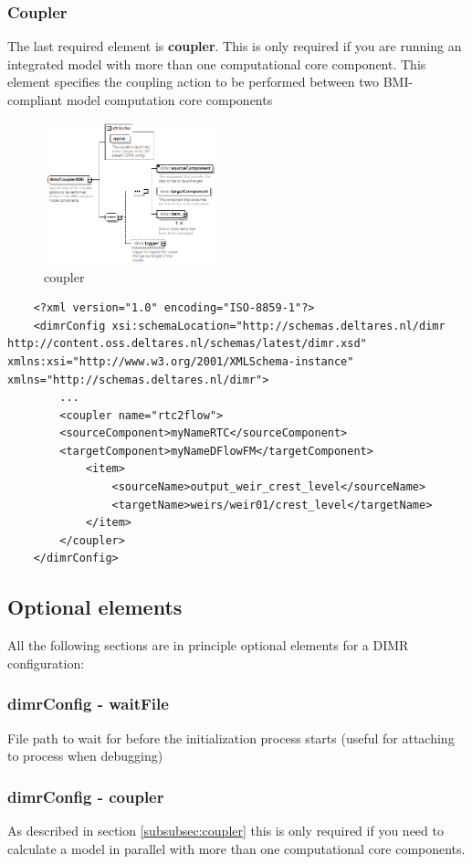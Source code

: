 \documentclass[signature]{deltares_manual}
\newcommand{\dimr}{\textrm{DIMR}\xspace}
\begin{document}
\subsubsection{Coupler}
\label{subsubsec:coupler}
The last required element is \textbf{coupler}. This is only required if you are running an integrated model with more than one computational core component. This element specifies the coupling action to be performed between two BMI-compliant model computation core components
\begin{figure}[H]
	\centering
	\includegraphics[width=0.45\textwidth] {pictures/dimr_diagrams/dimr_p17.png}
	\caption{coupler} 
	\label{fig:dimrCoupler}
\end{figure}
\begin{lstlisting}
	<?xml version="1.0" encoding="ISO-8859-1"?>
	<dimrConfig xsi:schemaLocation="http://schemas.deltares.nl/dimr http://content.oss.deltares.nl/schemas/latest/dimr.xsd" xmlns:xsi="http://www.w3.org/2001/XMLSchema-instance" xmlns="http://schemas.deltares.nl/dimr">
		...
		<coupler name="rtc2flow">
		<sourceComponent>myNameRTC</sourceComponent>
		<targetComponent>myNameDFlowFM</targetComponent>
			<item>
				<sourceName>output_weir_crest_level</sourceName>
				<targetName>weirs/weir01/crest_level</targetName>
			</item>
		</coupler>
	</dimrConfig>
\end{lstlisting}

\subsection{Optional elements}
\label{subsec:dimrOptionalxsd}
All the following sections are in principle optional elements for a \dimr configuration:
\subsubsection{dimrConfig - waitFile} 
File path to wait for before the initialization process starts (useful for attaching to process when debugging)
\subsubsection{dimrConfig - coupler} 
As described in section \autoref{subsubsec:coupler} this is only required if you need to calculate a model in parallel with more than one computational core components. 
\end{document}

